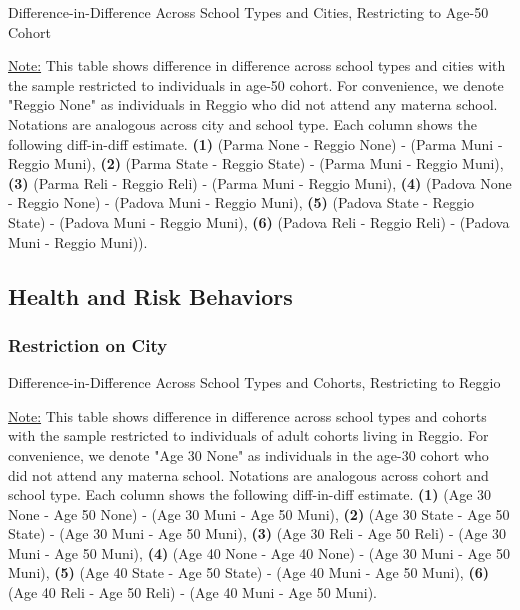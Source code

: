 \documentclass[11pt]{article}
\begin{document}
\begin{table}[H]
\begin{center}
	\caption{Difference-in-Difference Across School Types and Cities, Restricting to Age-50 Cohort} \label{table:LCh-50}
	\scalebox{0.80}{
		}
\end{center}
\footnotesize
\underline{Note:} This table shows difference in difference across school types and cities with the sample restricted to individuals in age-50 cohort. For convenience, we denote "Reggio None" as individuals in Reggio who did not attend any materna school. Notations are analogous across city and school type. Each column shows the following diff-in-diff estimate. \textbf{(1)} (Parma None - Reggio None) - (Parma Muni - Reggio Muni), \textbf{(2)} (Parma State - Reggio State) - (Parma Muni - Reggio Muni), \textbf{(3)} (Parma Reli - Reggio Reli) - (Parma Muni - Reggio Muni), \textbf{(4)} (Padova None - Reggio None) - (Padova Muni - Reggio Muni),  \textbf{(5)} (Padova State - Reggio State) - (Padova Muni - Reggio Muni), \textbf{(6)} (Padova Reli - Reggio Reli) - (Padova Muni - Reggio Muni)). 
\end{table}





\subsection{Health and Risk Behaviors}
\subsubsection{Restriction on City}
\begin{table}[H]
\begin{center}
	\caption{Difference-in-Difference Across School Types and Cohorts, Restricting to Reggio} \label{table:HC-Reggio}
	\scalebox{0.80}{
		}
\end{center}
\footnotesize
\underline{Note:} This table shows difference in difference across school types and cohorts with the sample restricted to individuals of adult cohorts living in Reggio. For convenience, we denote "Age 30 None" as individuals in the age-30 cohort who did not attend any materna school. Notations are analogous across cohort and school type. Each column shows the following diff-in-diff estimate. \textbf{(1)} (Age 30 None - Age 50 None) - (Age 30 Muni - Age 50 Muni), \textbf{(2)} (Age 30 State - Age 50 State) - (Age 30 Muni - Age 50 Muni), \textbf{(3)} (Age 30 Reli - Age 50 Reli) - (Age 30 Muni - Age 50 Muni), \textbf{(4)} (Age 40 None - Age 40 None) - (Age 30 Muni - Age 50 Muni),  \textbf{(5)} (Age 40 State - Age 50 State) - (Age 40 Muni - Age 50 Muni), \textbf{(6)} (Age 40 Reli - Age 50 Reli) - (Age 40 Muni - Age 50 Muni). 
\end{table}
\end{document}
